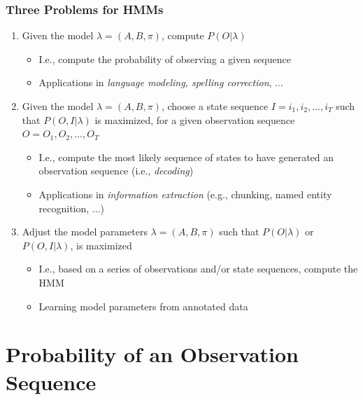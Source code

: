 \documentclass{beamer}
\begin{document}
\begin{frame} \frametitle{Three Problems for HMMs}

  \begin{enumerate}
  \item Given the model $\lambda = (A, B, \pi)$, compute $P(O|\lambda)$
    \begin{itemize}
    \item I.e., compute the probability of observing a given sequence
    \item Applications in \emph{language modeling, spelling correction}, $\ldots$
    \end{itemize}
  \item Given the model $\lambda = (A, B, \pi)$, choose a state sequence
    $I=i_1,i_2, \dotsc, i_T$ such that $P(O,I|\lambda)$ is maximized, for a
    given observation sequence $O=O_1,O_2,\dotsc,O_T$
    \begin{itemize}
    \item I.e., compute the most likely sequence of states to have generated an observation sequence (i.e., \emph{decoding})
    \item Applications in \emph{information extraction} (e.g., chunking, named entity recognition, $\ldots$)
    \end{itemize}
  \item Adjust the model parameters $\lambda = (A,B,\pi)$ such that
    $P(O|\lambda)$ or $P(O,I|\lambda)$, is maximized
    \begin{itemize}
    \item I.e., based on a series of observations and/or state sequences,
      compute the HMM
     \item Learning model parameters from annotated data
    \end{itemize}
  \end{enumerate}
  
\end{frame}


\section{Probability of an Observation Sequence}
\end{document}
